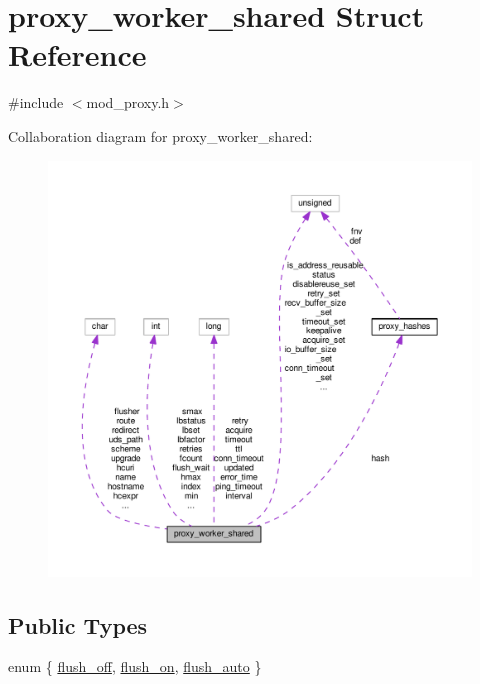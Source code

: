 \hypertarget{structproxy__worker__shared}{}\section{proxy\+\_\+worker\+\_\+shared Struct Reference}
\label{structproxy__worker__shared}


{\ttfamily \#include $<$mod\+\_\+proxy.\+h$>$}



Collaboration diagram for proxy\+\_\+worker\+\_\+shared\+:
\nopagebreak
\begin{figure}[H]
\begin{center}
\leavevmode
\includegraphics[width=350pt]{structproxy__worker__shared__coll__graph}
\end{center}
\end{figure}
\subsection*{Public Types}
\begin{DoxyCompactItemize}
\item 
enum \{ \hyperlink{structproxy__worker__shared_a23c4be5eef989cf75203671fc3c2d4eca662ba00d371280b545eb3b2c747bd09a}{flush\+\_\+off}, 
\hyperlink{structproxy__worker__shared_a23c4be5eef989cf75203671fc3c2d4eca53d0e639106c702c6aa07bd9d8596d2f}{flush\+\_\+on}, 
\hyperlink{structproxy__worker__shared_a23c4be5eef989cf75203671fc3c2d4ecab71946fede88ec9e8d994187a7919bda}{flush\+\_\+auto}
 \}
\end{DoxyCompactItemize}
